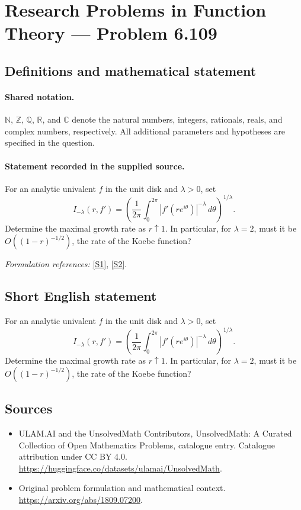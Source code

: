 \documentclass[11pt]{article}
\newcommand{\sref}[2]{\hyperlink{source:#1:#2}{[S#2]}}
\begin{document}
\section{Research Problems in Function Theory — Problem 6.109}\label{statement}

\subsection{Definitions and mathematical statement}

\paragraph{Shared notation.}$\mathbb N$, $\mathbb Z$, $\mathbb Q$, $\mathbb R$, and $\mathbb C$ denote the natural numbers, integers, rationals, reals, and complex numbers, respectively. All additional parameters and hypotheses are specified in the question.


\paragraph{Statement recorded in the supplied source.}
For an analytic univalent $f$ in the unit disk and $\lambda>0$, set
\[I_{-\lambda}(r,f')=\left(\frac1{2\pi}\int_0^{2\pi}|f'(re^{i\theta})|^{-\lambda}\,d\theta\right)^{1/\lambda}.\]
Determine the maximal growth rate as $r\uparrow1$. In particular, for $\lambda=2$, must it be $O((1-r)^{-1/2})$, the rate of the Koebe function?
\par\smallskip\textit{Formulation references:} \sref{statement}{1}, \sref{statement}{2}.
\subsection{Short English statement}
For an analytic univalent $f$ in the unit disk and $\lambda>0$, set
\[I_{-\lambda}(r,f')=\left(\frac1{2\pi}\int_0^{2\pi}|f'(re^{i\theta})|^{-\lambda}\,d\theta\right)^{1/\lambda}.\]
Determine the maximal growth rate as $r\uparrow1$. In particular, for $\lambda=2$, must it be $O((1-r)^{-1/2})$, the rate of the Koebe function?
\subsection{Sources}
\begin{itemize}
\item[\hypertarget{source:statement:1}{S1}] ULAM.AI and the UnsolvedMath Contributors, UnsolvedMath: A Curated Collection of Open Mathematics Problems, catalogue entry. Catalogue attribution under CC BY 4.0.
\url{https://huggingface.co/datasets/ulamai/UnsolvedMath}.
\item[\hypertarget{source:statement:2}{S2}] Original problem formulation and mathematical context.
\url{https://arxiv.org/abs/1809.07200}.
\end{itemize}
\label{end:statement}
\end{document}
